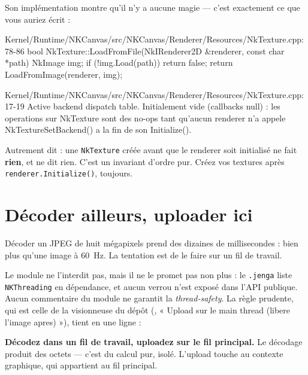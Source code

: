 Son implémentation montre qu'il n'y a aucune magie — c'est exactement ce que
vous auriez écrit :

\begin{nkcode}{Kernel/Runtime/NKCanvas/src/NKCanvas/Renderer/Resources/NkTexture.cpp:78-86}
        bool NkTexture::LoadFromFile(NkIRenderer2D &renderer, const char *path) {
            NkImage img;
            if (!img.Load(path))
                return false;
            return LoadFromImage(renderer, img);
        }
\end{nkcode}

\begin{nkpiege}
\begin{nkcode}{Kernel/Runtime/NKCanvas/src/NKCanvas/Renderer/Resources/NkTexture.cpp:17-19}
 Active backend dispatch table. Initialement vide (callbacks null) :
 les operations sur NkTexture sont des no-ops tant qu'aucun renderer
 n'a appele NkTextureSetBackend() a la fin de son Initialize().
\end{nkcode}

Autrement dit : une \texttt{NkTexture} créée avant que le renderer soit
initialisé ne fait \textbf{rien}, et ne dit rien. C'est un invariant d'ordre pur.
Créez vos textures après \texttt{renderer.Initialize()}, toujours.
\end{nkpiege}

\section{Décoder ailleurs, uploader ici}

Décoder un JPEG de huit mégapixels prend des dizaines de millisecondes : bien
plus qu'une image à 60~Hz. La tentation est de le faire sur un fil de travail.

Le module ne l'interdit pas, mais il ne le promet pas non plus : le
\texttt{.jenga} liste \texttt{NKThreading} en dépendance, et aucun verrou n'est
exposé dans l'API publique. Aucun commentaire du module ne garantit la
\emph{thread-safety}. La règle prudente, qui est celle de la visionneuse du
dépôt (, « Upload sur
le main thread (libere l'image apres) »), tient en une ligne :

\begin{nkretenir}
\textbf{Décodez dans un fil de travail, uploadez sur le fil principal.} Le
décodage produit des octets — c'est du calcul pur, isolé. L'upload touche au
contexte graphique, qui appartient au fil principal.
\end{nkretenir}

